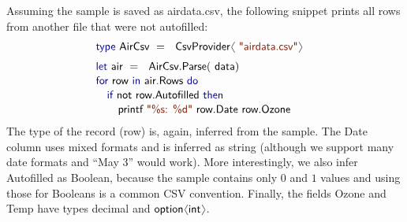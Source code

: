 \documentclass[preprint]{sigplanconf}
\newcommand{\langl}{\begin{picture}(4.5,7)
\put(1.1,2.5){\rotatebox{60}{\line(1,0){5.5}}}
\put(1.1,2.5){\rotatebox{300}{\line(1,0){5.5}}}
\end{picture}}
\newcommand{\rangl}{\begin{picture}(4.5,7)
\put(.9,2.5){\rotatebox{120}{\line(1,0){5.5}}}
\put(.9,2.5){\rotatebox{240}{\line(1,0){5.5}}}
\end{picture}}
\newcommand{\kvd}[1]{\textnormal{\textcolor{kvdclr}{\sffamily #1}}}
\newcommand{\str}[1]{\textnormal{\textcolor{strclr}{\sffamily "#1"}}}
\newcommand{\strf}[1]{\textnormal{\textcolor{strclr}{\sffamily #1}}}
\newcommand{\ident}[1]{\textnormal{\sffamily #1}}
\begin{document}
Assuming the sample is saved as \strf{airdata.csv}, the following snippet prints all
rows from another file that were not autofilled:
%
\begin{equation*}
\begin{array}{l}
 \kvd{type}~\ident{AirCsv}~=~\ident{CsvProvider}\langl\str{airdata.csv}\rangl\hspace{1em} \\[0.6em]
 \kvd{let}~\ident{air}~=~\ident{AirCsv.Parse}(\ident{data})\\[0.1em]
 \kvd{for}~\ident{row}~\kvd{in}~\ident{air.Rows}~\kvd{do}\\[0.1em]
 \quad\kvd{if}~\ident{not}~\ident{row.Autofilled}~\kvd{then}\\[0.1em]
 \quad\quad \ident{printf}~\str{\%s: \%d}~\ident{row.Date row.Ozone}\\
\end{array}
\end{equation*}
%
The type of the record (\ident{row}) is, again, inferred from the sample. The \ident{Date} column
uses mixed formats and is inferred as \ident{string} (although we support many date formats and 
``May 3'' would work). More interestingly, we also infer \ident{Autofilled} as Boolean, because 
the sample contains only $0$ and $1$ values and using those for Booleans is a common CSV convention.
Finally, the fields \ident{Ozone} and \ident{Temp} have types \ident{decimal} and
$\ident{option}\langl\ident{int}\rangl$.
\end{document}
